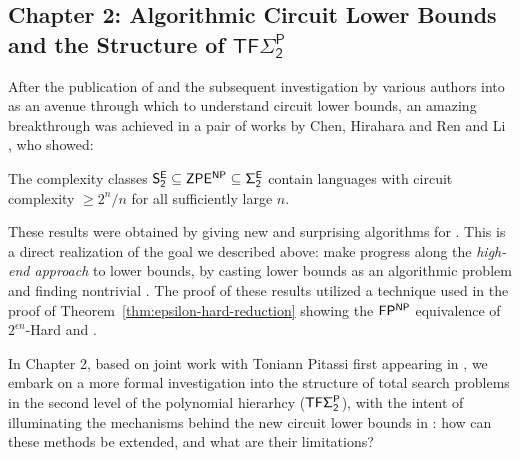 \subsection{Chapter 2: Algorithmic Circuit Lower Bounds and the Structure of $\mathsf{TF\Sigma_2^P}$}
After the publication of \cite{Korten} and the subsequent investigation by various authors into \avoid as an avenue through which to understand circuit lower bounds, an amazing breakthrough was achieved in a pair of works by Chen, Hirahara and Ren \cite{CHR} and Li \cite{Li}, who showed:
\begin{theorem*}
The complexity classes $\cl{S_2^E} \subseteq \cl{ZPE^{NP}} \subseteq \cl{\Sigma_2^E}$ contain languages with circuit complexity $\geq 2^n/n$ for all sufficiently large $n$.
\end{theorem*}
These results were obtained by giving new and surprising algorithms for \avoid. This is a direct realization of the goal we described above: make progress along the \emph{high-end approach} to lower bounds, by casting lower bounds as an algorithmic problem and finding nontrivial . The proof of these results utilized a technique used in the proof of Theorem~\ref{thm:epsilon-hard-reduction} showing the $\cl{FP^{NP}}$ equivalence of {\sc $2^{\epsilon n}$-Hard} and \avoid. 

In Chapter 2, based on joint work with Toniann Pitassi first appearing in \cite{KP24}, we embark on a more formal investigation into the structure of total search problems in the second level of the polynomial hierarhcy ($\cl{TF\Sigma_2^P}$), with the intent of illuminating the mechanisms behind the new circuit lower bounds in \cite{CHR,Li}: how can these methods be extended, and what are their limitations? 

